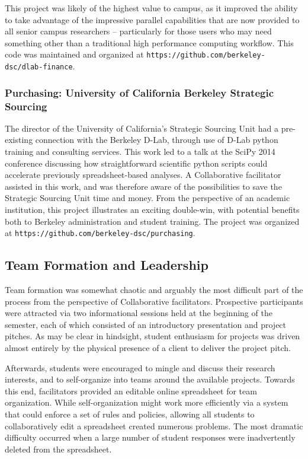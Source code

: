 \documentclass[12pt]{article}
\begin{document}
This project was likely of the highest value to campus, as it improved the ability to take advantage of the impressive parallel capabilities that are now provided to all senior campus researchers -- particularly for those users who may need something other than a traditional high performance computing workflow. This code was maintained and organized at \texttt{https://github.com/berkeley-dsc/dlab-finance}.

\subsubsection*{Purchasing: University of California Berkeley Strategic Sourcing}

The director of the University of California's Strategic Sourcing Unit had a pre-existing connection with the Berkeley D-Lab, through use of D-Lab python training and consulting services. This work led to a talk at the SciPy 2014 conference discussing how straightforward scientific python scripts could accelerate previously spreadsheet-based analyses. A Collaborative facilitator assisted in this work, and was therefore aware of the possibilities to save the Strategic Sourcing Unit time and money. From the perspective of an academic institution, this project illustrates an exciting double-win, with potential benefits both to Berkeley administration and student training.  The project was organized at \texttt{https://github.com/berkeley-dsc/purchasing}.

\subsection{Team Formation and Leadership}

Team formation was somewhat chaotic and arguably the most difficult part of the process from the perspective of Collaborative facilitators.  Prospective participants were attracted via two informational sessions held at the beginning of the semester, each of which consisted of an introductory presentation and project pitches.  As may be clear in hindsight, student enthusiasm for projects was driven almost entirely by the physical presence of a client to deliver the project pitch.

Afterwards, students were encouraged to mingle and discuss their research interests, and to self-organize into teams around the available projects. Towards this end, facilitators provided an editable online spreadsheet for team organization. While self-organization might work more efficiently via a system that could enforce a set of rules and policies, allowing all students to collaboratively edit a spreadsheet created numerous problems. The most dramatic difficulty occurred when a large number of student responses were inadvertently deleted from the spreadsheet.
\end{document}
